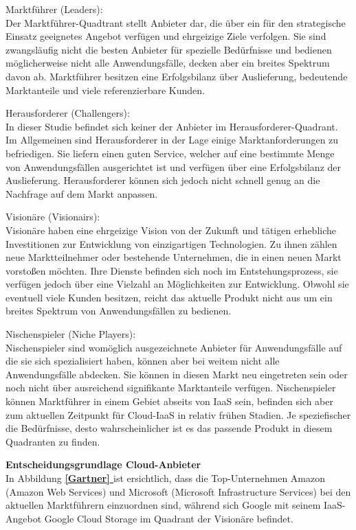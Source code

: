 \documentclass[13pt,a4paper,bibliography=totocnumbered,listof=totocnumbered]{scrartcl}
\newcommand*{\fullref}[1]{\textbf{\hyperref[{#1}]{\ref*{#1} \nameref*{#1}}}}
\begin{document}
\begin{compactitem}
\item{Marktführer (Leaders):}
\\Der Marktführer-Quadtrant stellt Anbieter dar, die über ein für den strategische Einsatz geeignetes Angebot verfügen und ehrgeizige Ziele verfolgen. Sie sind zwangsläufig nicht die besten Anbieter für spezielle Bedürfnisse und bedienen möglicherweise nicht alle Anwendungsfälle, decken aber ein breites Spektrum davon ab. Marktführer besitzen eine Erfolgsbilanz über Auslieferung, bedeutende Marktanteile und viele referenzierbare Kunden.
\item{Herausforderer (Challengers):}
\\In dieser Studie befindet sich keiner der Anbieter im Herausforderer-Quadrant. Im Allgemeinen sind Herausforderer in der Lage einige Marktanforderungen zu befriedigen. Sie liefern einen guten Service, welcher auf eine bestimmte Menge von Anwendungsfällen ausgerichtet ist und verfügen über eine Erfolgsbilanz der Auslieferung. Herausforderer können sich jedoch nicht schnell genug an die Nachfrage auf dem Markt anpassen.
\item{Visionäre (Visionairs):}
\\Visionäre haben eine ehrgeizige Vision von der Zukunft und tätigen erhebliche Investitionen zur Entwicklung von einzigartigen Technologien. Zu ihnen zählen neue Marktteilnehmer oder bestehende Unternehmen, die in einen neuen Markt vorstoßen möchten. Ihre Dienste befinden sich noch im Entstehungsprozess, sie verfügen jedoch über eine Vielzahl an Möglichkeiten zur Entwicklung. Obwohl sie eventuell viele Kunden besitzen, reicht das aktuelle Produkt nicht aus um ein breites Spektrum von Anwendungsfällen zu bedienen.
\item{Nischenspieler (Niche Players):}
\\Nischenspieler sind womöglich ausgezeichnete Anbieter für Anwendungsfälle auf die sie sich spezialisiert haben, können aber bei weitem nicht alle Anwendungsfälle abdecken. Sie können in diesen Markt neu eingetreten sein oder noch nicht über ausreichend signifikante Marktanteile verfügen. Nischenspieler können Marktführer in einem Gebiet abseits von IaaS sein, befinden sich aber zum aktuellen Zeitpunkt für Cloud-IaaS in relativ frühen Stadien. Je speziefischer die Bedürfnisse, desto wahrscheinlicher ist es das passende Produkt in diesem Quadranten zu finden.
\end{compactitem}

\textbf{Entscheidungsgrundlage Cloud-Anbieter}\\
In Abbildung \fullref{Gartner} ist ersichtlich, dass die Top-Unternehmen Amazon (Amazon Web Services) und Microsoft (Microsoft Infrastructure Services) bei den aktuellen Marktführern einzuordnen sind, während sich Google mit seinem IaaS-Angebot Google Cloud Storage im Quadrant der Visionäre befindet.
\end{document}
